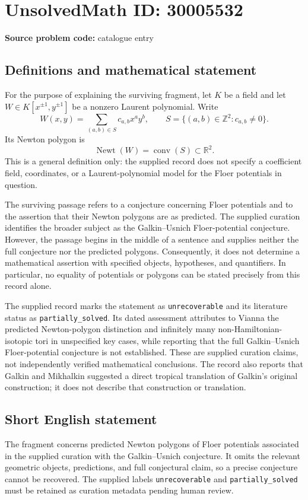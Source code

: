 \documentclass[11pt]{article}
\newcommand{\Z}{\mathbb{Z}}
\newcommand{\R}{\mathbb{R}}
\begin{document}
\section*{UnsolvedMath ID: 30005532}
\textbf{Source problem code:} catalogue entry
\subsection{Definitions and mathematical statement}
For the purpose of explaining the surviving fragment, let \(K\) be a field and let \(W\in K[x^{\pm1},y^{\pm1}]\) be a nonzero Laurent polynomial. Write
\[
W(x,y)=\sum_{(a,b)\in S}c_{a,b}x^ay^b,
\qquad
S=\{(a,b)\in\Z^2:c_{a,b}\ne0\}.
\]
Its Newton polygon is
\[
\operatorname{Newt}(W)=\operatorname{conv}(S)\subset\R^2.
\]
This is a general definition only: the supplied record does not specify a coefficient field, coordinates, or a Laurent-polynomial model for the Floer potentials in question.

The surviving passage refers to a conjecture concerning Floer potentials and to the assertion that their Newton polygons are as predicted. The supplied curation identifies the broader subject as the Galkin--Usnich Floer-potential conjecture. However, the passage begins in the middle of a sentence and supplies neither the full conjecture nor the predicted polygons. Consequently, it does not determine a mathematical assertion with specified objects, hypotheses, and quantifiers. In particular, no equality of potentials or polygons can be stated precisely from this record alone.

The supplied record marks the statement as \texttt{unrecoverable} and its literature status as \texttt{partially\_solved}. Its dated assessment attributes to Vianna the predicted Newton-polygon distinction and infinitely many non-Hamiltonian-isotopic tori in unspecified key cases, while reporting that the full Galkin--Usnich Floer-potential conjecture is not established. These are supplied curation claims, not independently verified mathematical conclusions. The record also reports that Galkin and Mikhalkin suggested a direct tropical translation of Galkin's original construction; it does not describe that construction or translation.
\subsection{Short English statement}
The fragment concerns predicted Newton polygons of Floer potentials associated in the supplied curation with the Galkin--Usnich conjecture. It omits the relevant geometric objects, predictions, and full conjectural claim, so a precise conjecture cannot be recovered. The supplied labels \texttt{unrecoverable} and \texttt{partially\_solved} must be retained as curation metadata pending human review.
\end{document}
